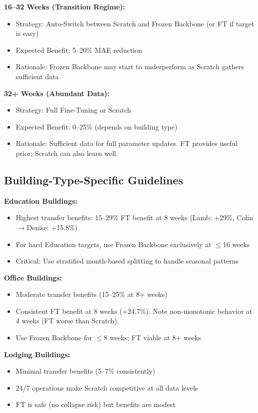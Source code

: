 \documentclass[12pt,a4paper]{report}
\begin{document}
\textbf{16--32 Weeks (Transition Regime):}
\begin{itemize}
    \item Strategy: Auto-Switch between Scratch and Frozen Backbone (or FT if target is easy)
    \item Expected Benefit: 5--20\% MAE reduction
    \item Rationale: Frozen Backbone may start to underperform as Scratch gathers sufficient data
\end{itemize}

\textbf{32+ Weeks (Abundant Data):}
\begin{itemize}
    \item Strategy: Full Fine-Tuning or Scratch
    \item Expected Benefit: 0--25\% (depends on building type)
    \item Rationale: Sufficient data for full parameter updates. FT provides useful prior; Scratch can also learn well.
\end{itemize}

\subsection{Building-Type-Specific Guidelines}

\textbf{Education Buildings:}
\begin{itemize}
    \item Highest transfer benefits: 15--29\% FT benefit at 8 weeks (Lamb: +29\%, Colin$\to$Denise: +15.8\%)
    \item For hard Education targets, use Frozen Backbone exclusively at $\leq$16 weeks
    \item Critical: Use stratified month-based splitting to handle seasonal patterns
\end{itemize}

\textbf{Office Buildings:}
\begin{itemize}
    \item Moderate transfer benefits (15--25\% at 8+ weeks)
    \item Consistent FT benefit at 8 weeks (+24.7\%). Note non-monotonic behavior at 4 weeks (FT worse than Scratch).
    \item Use Frozen Backbone for $\leq$8 weeks; FT viable at 8+ weeks
\end{itemize}

\textbf{Lodging Buildings:}
\begin{itemize}
    \item Minimal transfer benefits (5--7\% consistently)
    \item 24/7 operations make Scratch competitive at all data levels
    \item FT is safe (no collapse risk) but benefits are modest
\end{itemize}
\end{document}
